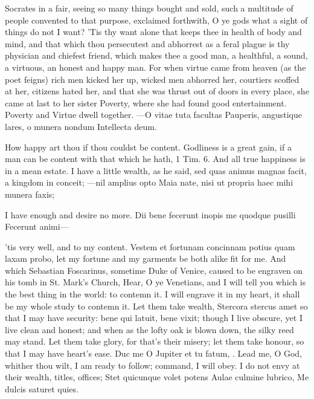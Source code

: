 {Socrates in a fair, seeing so many things bought and sold, such a
multitude of people convented to that purpose, exclaimed forthwith, O
ye gods what a sight of things do not I want? 'Tis thy want alone that
keeps thee in health of body and mind, and that which thou persecutest
and abhorrest as a feral plague is thy physician and chiefest
friend, which makes thee a good man, a healthful, a sound, a virtuous,
an honest and happy man. For when virtue came from heaven (as the poet
feigns) rich men kicked her up, wicked men abhorred her, courtiers
scoffed at her, citizens hated her, and that she was thrust out
of doors in every place, she came at last to her sister Poverty, where
she had found good entertainment. Poverty and Virtue dwell together.
---O vitae tuta facultas
Pauperis, angustique lares, o munera nondum
Intellecta deum.

How happy art thou if thou couldst be content. Godliness is a great
gain, if a man can be content with that which he hath, 1 Tim.  6.
And all true happiness is in a mean estate. I have a little wealth, as
he said, sed quas animus magnas facit, a kingdom in conceit;
---nil amplius opto
Maia nate, nisi ut propria haec mihi munera faxis;

I have enough and desire no more.
Dii bene fecerunt inopis me quodque pusilli
Fecerunt animi---

'tis very well, and to my content. Vestem et fortunam concinnam
potius quam laxam probo, let my fortune and my garments be both alike
fit for me. And which Sebastian Foscarinus, sometime Duke of
Venice, caused to be engraven on his tomb in St. Mark's Church, Hear, O
ye Venetians, and I will tell you which is the best thing in the world:
to contemn it. I will engrave it in my heart, it shall be my whole
study to contemn it. Let them take wealth, Stercora stercus amet so
that I may have security: bene qui latuit, bene vixit; though I live
obscure,  yet I live clean and honest; and when as the lofty oak
is blown down, the silky reed may stand. Let them take glory, for
that's their misery; let them take honour, so that I may have heart's
ease. Duc me O Jupiter et tu fatum, \etc{}. Lead me, O God, whither
thou wilt, I am ready to follow; command, I will obey. I do not envy at
their wealth, titles, offices;
Stet quicunque volet potens
Aulae culmine lubrico,
Me dulcis saturet quies.

}
